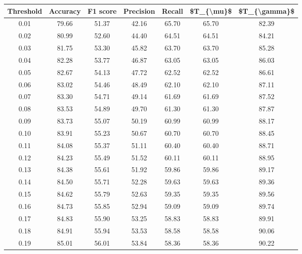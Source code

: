 \begin{tabular}{|c|c|c|c|c|c|c|}
\hline
 Threshold &  Accuracy &  F1 score &  Precision &  Recall &  \$T\_\{\textbackslash mu\}\$ &  \$T\_\{\textbackslash gamma\}\$ \\
\hline
      0.01 &     79.66 &     51.37 &      42.16 &   65.70 &      65.70 &         82.39 \\
      0.02 &     80.99 &     52.60 &      44.40 &   64.51 &      64.51 &         84.21 \\
      0.03 &     81.75 &     53.30 &      45.82 &   63.70 &      63.70 &         85.28 \\
      0.04 &     82.28 &     53.77 &      46.87 &   63.05 &      63.05 &         86.03 \\
      0.05 &     82.67 &     54.13 &      47.72 &   62.52 &      62.52 &         86.61 \\
      0.06 &     83.02 &     54.46 &      48.49 &   62.10 &      62.10 &         87.11 \\
      0.07 &     83.30 &     54.71 &      49.14 &   61.69 &      61.69 &         87.52 \\
      0.08 &     83.53 &     54.89 &      49.70 &   61.30 &      61.30 &         87.87 \\
      0.09 &     83.73 &     55.07 &      50.19 &   60.99 &      60.99 &         88.17 \\
      0.10 &     83.91 &     55.23 &      50.67 &   60.70 &      60.70 &         88.45 \\
      0.11 &     84.08 &     55.37 &      51.11 &   60.40 &      60.40 &         88.71 \\
      0.12 &     84.23 &     55.49 &      51.52 &   60.11 &      60.11 &         88.95 \\
      0.13 &     84.38 &     55.61 &      51.92 &   59.86 &      59.86 &         89.17 \\
      0.14 &     84.50 &     55.71 &      52.28 &   59.63 &      59.63 &         89.36 \\
      0.15 &     84.62 &     55.79 &      52.63 &   59.35 &      59.35 &         89.56 \\
      0.16 &     84.73 &     55.85 &      52.94 &   59.09 &      59.09 &         89.74 \\
      0.17 &     84.83 &     55.90 &      53.25 &   58.83 &      58.83 &         89.91 \\
      0.18 &     84.91 &     55.94 &      53.53 &   58.58 &      58.58 &         90.06 \\
      0.19 &     85.01 &     56.01 &      53.84 &   58.36 &      58.36 &         90.22 \\

\end{tabular}
